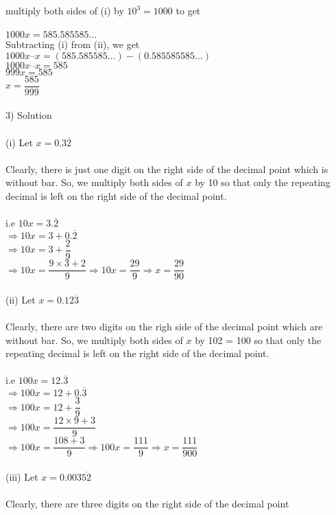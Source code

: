 \documentclass[a4paper,10pt]{article}
\begin{document}
{{multiply both sides of (i) by $10^3 =  1000$ to get\\\\
$1000 x = 585.585585...$\\
Subtracting (i) from (ii), we get\\
$1000 x –x = (585.585585...)- (0.585585585...)$\\
$1000 x – x = 585$\\
$999x = 585$\\
$ x = \dfrac{585}{999}$\\\\
3) Solution\\\\
(i) Let $x = 0.3\overline{2}$ \\\\
Clearly, there is just one digit on the right side of the decimal point
which is without bar. So,
we multiply both sides of $x$ by 10 so that only the repeating decimal is
left on the right side of
the decimal point.\\\\
 i.e $10 x = 3.\overline{2}$\\
$\Rightarrow 10x = 3+0.\overline{2}$\\
$\Rightarrow 10x = 3+\dfrac{2}{9}$\\
$\Rightarrow 10x = \dfrac{9\times3+2}{9} \Rightarrow 10x = \dfrac{29}{9}
\Rightarrow x = \dfrac{29}{90}$\\\\
(ii) Let $x = 0.12\overline{3}$\\\\
Clearly, there are two digits on the righ side of the decimal point
which are without bar. So,
we multiply both sides of $x$ by 102 = 100 so that only the repeating
decimal is left on the right
side of the decimal point.\\\\
i.e $100x = 12.\overline{3}$\\
$\Rightarrow 100x = 12+0.\overline{3}$\\  
$\Rightarrow 100x = 12+\dfrac{3}{9}$\\
$\Rightarrow 100x = \dfrac{12\times9+3}{9}$\\
$\Rightarrow 100x = \dfrac{108+3}{9} \Rightarrow 100x = \dfrac{111}{9}
\Rightarrow x = \dfrac{111}{900}$\\\\
(iii) Let $x = 0.003\overline{52}$\\\\
Clearly, there are three digits on the right side of the decimal point
}}
\end{document}
